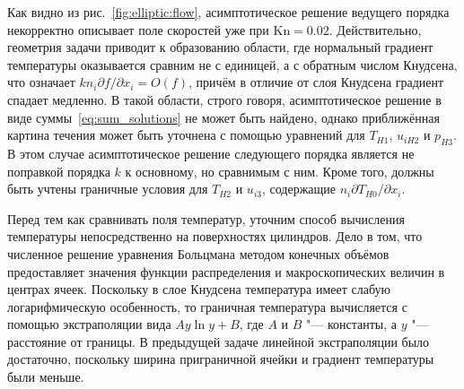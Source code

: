 \documentclass[
aps,%
12pt,%
final,%
notitlepage,%
oneside,%
onecolumn,%
nobibnotes,%
nofootinbib,%
superscriptaddress,%
noshowpacs,%
showkeys,%
floatfix,%
tightenlines,%
centertags]%
{revtex4}
\newcommand{\Kn}{\mathrm{Kn}}
\newcommand{\Pder}[2][]{\partial#1/\partial#2}
\newcommand{\OO}[1]{O(#1)}
\begin{document}
Как видно из рис.~\ref{fig:elliptic:flow}, асимптотическое решение ведущего порядка некорректно описывает
поле скоростей уже при \(\Kn=0.02\). Действительно, геометрия задачи приводит к образованию области,
где нормальный градиент температуры оказывается сравним не с единицей, а с обратным числом Кнудсена,
что означает \(kn_i\Pder[f]{x_i} = \OO{f}\), причём в отличие от слоя Кнудсена градиент спадает медленно.
В такой области, строго говоря, асимптотическое решение в виде суммы~\eqref{eq:sum_solutions}
не может быть найдено, однако приближённая картина течения может быть уточнена
с помощью уравнений для \(T_{H1}\), \(u_{iH2}\) и \(p_{H3}\).
В этом случае асимптотическое решение следующего порядка является не поправкой порядка \(k\)
к основному, но сравнимым с ним.
Кроме того, должны быть учтены граничные условия для \(T_{H2}\) и \(u_{i3}\),
содержащие \(n_i\Pder[T_{H0}]{x_i}\).

Перед тем как сравнивать поля температур, уточним способ вычисления температуры
непосредственно на поверхностях цилиндров.
Дело в том, что численное решение уравнения Больцмана методом конечных объёмов
предоставляет значения функции распределения и макроскопических величин в центрах ячеек.
Поскольку в слое Кнудсена температура имеет слабую логарифмическую особенность,
то граничная температура вычисляется с помощью экстраполяции вида \(Ay\ln{y}+B\),
где \(A\) и \(B\) "--- константы, а \(y\) "--- расстояние от границы.
В предыдущей задаче линейной экстраполяции было достаточно,
поскольку ширина приграничной ячейки и градиент температуры были меньше.
\end{document}
